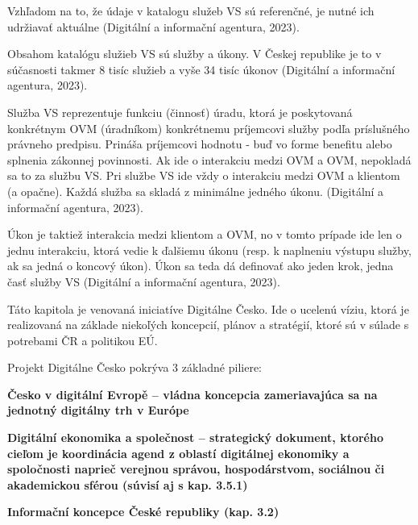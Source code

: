 %

Vzhľadom na to, že údaje v katalogu služeb VS sú referenčné, je nutné ich udržiavať aktuálne \scr(Digitální a informační agentura, 2023).

Obsahom katalógu služieb VS sú služby a úkony. V Českej republike je to v súčasnosti takmer 8 tisíc služieb a vyše 34 tisíc úkonov \scr(Digitální a informační agentura, 2023).

Služba VS reprezentuje funkciu (činnosť) úradu, ktorá je poskytovaná konkrétnym OVM (úradníkom) konkrétnemu príjemcovi služby podľa príslušného právneho predpisu. Prináša príjemcovi hodnotu - buď vo forme benefitu alebo splnenia zákonnej povinnosti. Ak ide o interakciu medzi OVM a OVM, nepokladá sa to za službu VS. Pri službe VS ide vždy o interakciu medzi OVM a klientom (a opačne). Každá služba sa skladá z minimálne jedného úkonu. \scr(Digitální a informační agentura, 2023).

Úkon je taktiež interakcia medzi klientom a OVM, no v tomto prípade ide len o jednu interakciu, ktorá vedie k ďalšiemu úkonu (resp. k naplneniu výstupu služby, ak sa jedná o koncový úkon). Úkon sa teda dá definovať ako jeden krok, jedna časť služby VS \scr(Digitální a informační agentura, 2023).



Táto kapitola je venovaná iniciatíve Digitálne Česko. Ide o ucelenú víziu, ktorá je realizovaná na základe niekoľých koncepcií, plánov a stratégií, ktoré sú v súlade s potrebami ČR a politikou EÚ.

Projekt Digitálne Česko pokrýva 3 základné piliere:
\startitemize
\item{\start \bf Česko v digitální Evropě \stop -- vládna koncepcia zameriavajúca sa na jednotný digitálny trh v Európe} 
\item{\start \bf Digitální ekonomika a společnost \stop -- strategický dokument, ktorého cieľom je koordinácia agend z oblastí digitálnej ekonomiky a spoločnosti naprieč verejnou správou, hospodárstvom, sociálnou či akademickou sférou (súvisí aj s kap. 3.5.1)}
\item{\start \bf Informační koncepce České republiky \stop (kap. 3.2)}
\stopitemize


